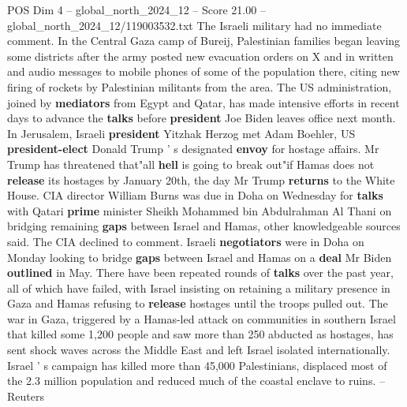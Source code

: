\begin{textsample}{POS Dim 4 – global\_north\_2024\_12 – Score 21.00 – global\_north\_2024\_12/119003532.txt}
The Israeli military had no immediate comment.
In the Central Gaza camp of Bureij, Palestinian families began leaving some districts after the army posted new evacuation orders on X and in written and audio messages to mobile phones of some of the population there, citing new firing of rockets by Palestinian militants from the area.
The US administration, joined by \textbf{mediators} from Egypt and Qatar, has made intensive efforts in recent days to advance the \textbf{talks} before \textbf{president} Joe Biden leaves office next month.
In Jerusalem, Israeli \textbf{president} Yitzhak Herzog met Adam Boehler, US \textbf{president-elect} Donald Trump ' s designated \textbf{envoy} for hostage affairs.
Mr Trump has threatened that"all \textbf{hell} is going to break out"if Hamas does not \textbf{release} its hostages by January 20th, the day Mr Trump \textbf{returns} to the White House.
CIA director William Burns was due in Doha on Wednesday for \textbf{talks} with Qatari \textbf{prime} minister Sheikh Mohammed bin Abdulrahman Al Thani on bridging remaining \textbf{gaps} between Israel and Hamas, other knowledgeable sources said.
The CIA declined to comment.
Israeli \textbf{negotiators} were in Doha on Monday looking to bridge \textbf{gaps} between Israel and Hamas on a \textbf{deal} Mr Biden \textbf{outlined} in May.
There have been repeated rounds of \textbf{talks} over the past year, all of which have failed, with Israel insisting on retaining a military presence in Gaza and Hamas refusing to \textbf{release} hostages until the troops pulled out.
The war in Gaza, triggered by a Hamas-led attack on communities in southern Israel that killed some 1,200 people and saw more than 250 abducted as hostages, has sent shock waves across the Middle East and left Israel isolated internationally.
Israel ' s campaign has killed more than 45,000 Palestinians, displaced most of the 2.3 million population and reduced much of the coastal enclave to ruins. -- Reuters

\end{textsample}

